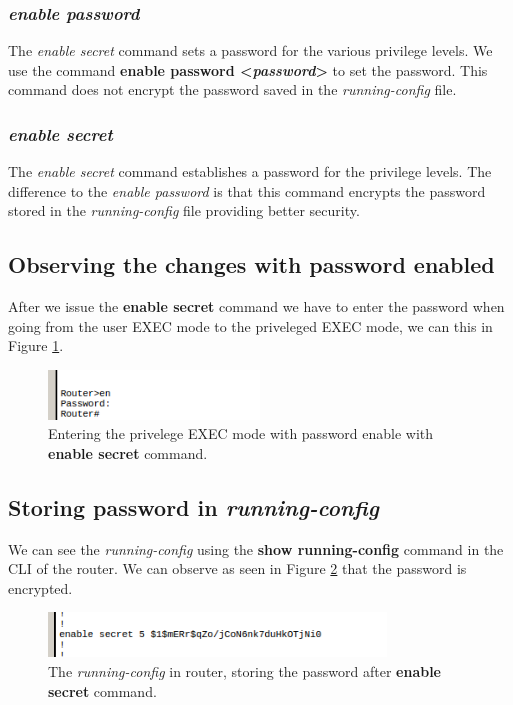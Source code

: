 \documentclass{article}
\begin{document}
\subsubsection{\emph{enable password}}
The \textit{enable secret} command sets a password for the various privilege levels. We use the command \textbf{enable password \textless\emph{password}\textgreater} to set the password. This command does not encrypt the password saved in the \emph{running-config} file.

\subsubsection{\emph{enable secret}}
The \textit{enable secret}  command establishes a password for the privilege levels. The difference to the \textit{enable password} is that this command encrypts the password stored in the \emph{running-config} file providing better security.

\subsection{Observing the changes with password enabled}

After we issue the \textbf{enable secret} command we have to enter the password when going from the user EXEC mode to the priveleged EXEC mode, we can this in Figure \ref{fig:passprev}. 

\begin{figure}
\centering
\includegraphics[width=0.5\textwidth]{imgs/passprev.png}
\caption{Entering the privelege EXEC mode with password enable with \textbf{enable secret} command.}
\label{fig:passprev}
\end{figure}

\subsection{Storing password in \emph{running-config}}
We can see the \textit{running-config} using the \textbf{show running-config} command in the CLI of the router. We can observe as seen in Figure \ref{fig:runconfpass} that the password is encrypted.

\begin{figure}[h]
    \centering
    \includegraphics[width=0.8\textwidth]{imgs/runconfpass}
    \caption{The \textit{running-config} in router, storing the password after \textbf{enable secret} command.}
    \label{fig:runconfpass}
\end{figure}
\end{document}
